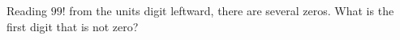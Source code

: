 Reading $99!$ from the units digit leftward, there are several zeros. What is the first digit that is not zero?
